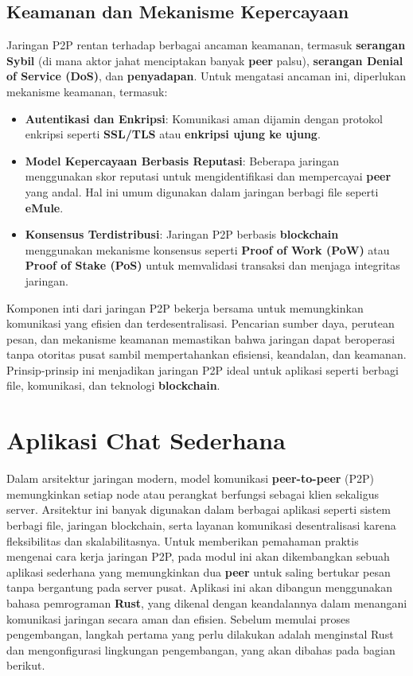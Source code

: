 \subsection{Keamanan dan Mekanisme Kepercayaan}
Jaringan P2P rentan terhadap berbagai ancaman keamanan, termasuk \textbf{serangan Sybil} (di mana aktor jahat menciptakan banyak \textbf{peer} palsu), \textbf{serangan Denial of Service (DoS)}, dan \textbf{penyadapan}. Untuk mengatasi ancaman ini, diperlukan mekanisme keamanan, termasuk:
\begin{itemize}
	\item \textbf{Autentikasi dan Enkripsi}: Komunikasi aman dijamin dengan protokol enkripsi seperti \textbf{SSL/TLS} atau \textbf{enkripsi ujung ke ujung}.
	\item \textbf{Model Kepercayaan Berbasis Reputasi}: Beberapa jaringan menggunakan skor reputasi untuk mengidentifikasi dan mempercayai \textbf{peer} yang andal. Hal ini umum digunakan dalam jaringan berbagi file seperti \textbf{eMule}.
	\item \textbf{Konsensus Terdistribusi}: Jaringan P2P berbasis \textbf{blockchain} menggunakan mekanisme konsensus seperti \textbf{Proof of Work (PoW)} atau \textbf{Proof of Stake (PoS)} untuk memvalidasi transaksi dan menjaga integritas jaringan.
\end{itemize}

Komponen inti dari jaringan P2P bekerja bersama untuk memungkinkan komunikasi yang efisien dan terdesentralisasi. Pencarian sumber daya, perutean pesan, dan mekanisme keamanan memastikan bahwa jaringan dapat beroperasi tanpa otoritas pusat sambil mempertahankan efisiensi, keandalan, dan keamanan. Prinsip-prinsip ini menjadikan jaringan P2P ideal untuk aplikasi seperti berbagi file, komunikasi, dan teknologi \textbf{blockchain}.



\section{Aplikasi Chat Sederhana}

Dalam arsitektur jaringan modern, model komunikasi \textbf{peer-to-peer} (P2P) memungkinkan setiap node atau perangkat berfungsi sebagai klien sekaligus server. Arsitektur ini banyak digunakan dalam berbagai aplikasi seperti sistem berbagi file, jaringan blockchain, serta layanan komunikasi desentralisasi karena fleksibilitas dan skalabilitasnya. Untuk memberikan pemahaman praktis mengenai cara kerja jaringan P2P, pada modul ini akan dikembangkan sebuah aplikasi sederhana yang memungkinkan dua \textbf{peer} untuk saling bertukar pesan tanpa bergantung pada server pusat. Aplikasi ini akan dibangun menggunakan bahasa pemrograman \textbf{Rust}, yang dikenal dengan keandalannya dalam menangani komunikasi jaringan secara aman dan efisien. Sebelum memulai proses pengembangan, langkah pertama yang perlu dilakukan adalah menginstal Rust dan mengonfigurasi lingkungan pengembangan, yang akan dibahas pada bagian berikut.


